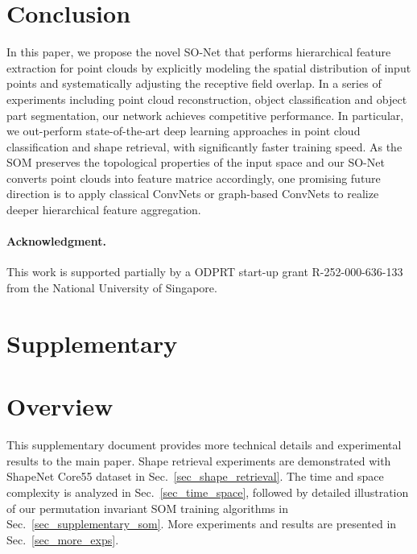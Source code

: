 \documentclass[10pt,twocolumn,letterpaper]{article}
\begin{document}
\section{Conclusion} \label{sec_conclusion}
In this paper, we propose the novel SO-Net that performs hierarchical feature extraction for point clouds by explicitly modeling the spatial distribution of input points and systematically adjusting the receptive field overlap. In a series of experiments including point cloud reconstruction, object classification and object part segmentation, our network achieves competitive performance. In particular, we out-perform state-of-the-art deep learning approaches in point cloud classification and shape retrieval, with significantly faster training speed. As the SOM preserves the topological properties of the input space and our SO-Net converts point clouds into feature matrice accordingly, one promising future direction is to apply classical ConvNets or graph-based ConvNets to realize deeper hierarchical feature aggregation.


\vspace{-8pt}
\paragraph{Acknowledgment.} \label{sec_ack}
This work is supported partially by a ODPRT start-up grant R-252-000-636-133 from the National University of Singapore.




{\small


}










\newpage
\section*{Supplementary}

\appendix
\iffalse\fi\section{Overview}
This supplementary document provides more technical details and experimental results to the main paper. Shape retrieval experiments are demonstrated with ShapeNet Core55 dataset in Sec.~\ref{sec_shape_retrieval}. The time and space complexity is analyzed in Sec.~\ref{sec_time_space}, followed by detailed illustration of our permutation invariant SOM training algorithms in Sec.~\ref{sec_supplementary_som}. More experiments and results are presented in Sec.~\ref{sec_more_exps}.
\end{document}

